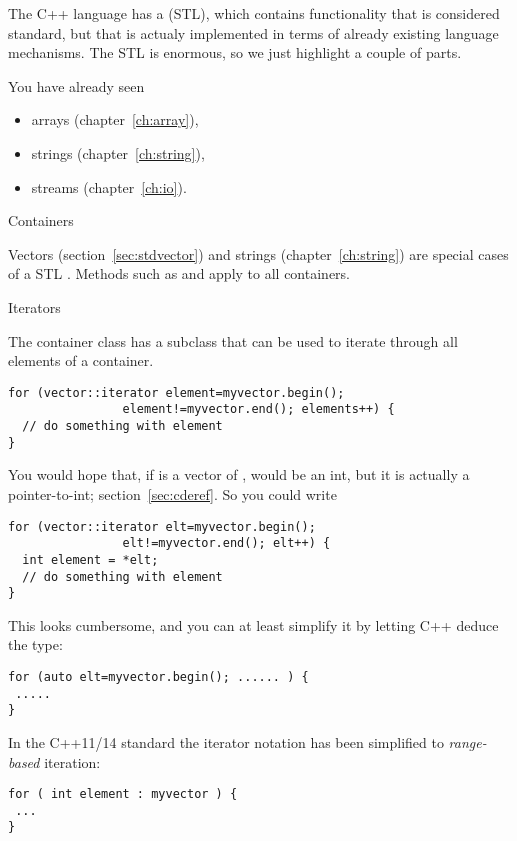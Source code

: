 
The C++ language has a  (STL),
which contains functionality that is considered standard, but that is
actualy implemented in terms of already existing language
mechanisms. The STL is enormous, so we just highlight a couple of
parts.

You have already seen
\begin{itemize}
\item
  arrays (chapter~\ref{ch:array}),
\item strings (chapter~\ref{ch:string}),
\item streams (chapter~\ref{ch:io}).
\end{itemize}

 {Containers}

Vectors (section~\ref{sec:stdvector}) and strings
(chapter~\ref{ch:string}) are special cases of a STL
. Methods such as  and 
apply to all containers.

 {Iterators}

The container class has a subclass  that can be
used to iterate through all elements of a container.
\begin{verbatim}
for (vector::iterator element=myvector.begin();
                element!=myvector.end(); elements++) {
  // do something with element
}
\end{verbatim}
You would hope that, if  is a vector of ,
 would be an int, but it is actually a pointer-to-int;
section~\ref{sec:cderef}. So you could write
\begin{verbatim}
for (vector::iterator elt=myvector.begin();
                elt!=myvector.end(); elt++) {
  int element = *elt;
  // do something with element
}
\end{verbatim}
This looks cumbersome, and you can at least simplify it by 
letting C++ deduce the type:
\begin{verbatim}
for (auto elt=myvector.begin(); ...... ) {
 .....
}
\end{verbatim}
In the C++11/14 standard the iterator notation has been simplified to
\emph{range-based} iteration:
\begin{verbatim}
for ( int element : myvector ) {
 ...
}
\end{verbatim}

